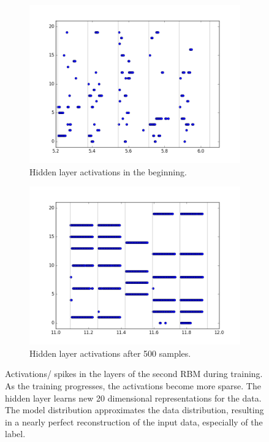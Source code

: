 \begin{figure}[h!]
	\begin{subfigure}[t]{.32\textwidth}
  		\centering
  		\includegraphics[width=.9\linewidth]{imgs/7x7/20076_h.png}
  		\caption{Hidden layer activations in the beginning.}
  		\label{fig:sub2}
	\end{subfigure}
	\begin{subfigure}[t]{.32\textwidth}
  		\centering
  		\includegraphics[width=.9\linewidth]{imgs/7x7/20946_h.png}
  		\caption{Hidden layer  activations after 500 samples.}
  		\label{fig:sub2}
	\end{subfigure}
	\caption{Activations/ spikes in the layers of the second RBM during training. As the training progresses, the activations become more sparse. The hidden layer learns new 20 dimensional representations for the data. The model distribution approximates the data distribution, resulting in a nearly perfect reconstruction of the input data, especially of the label.}
	\label{fig:stripesspl2}
\end{figure}


